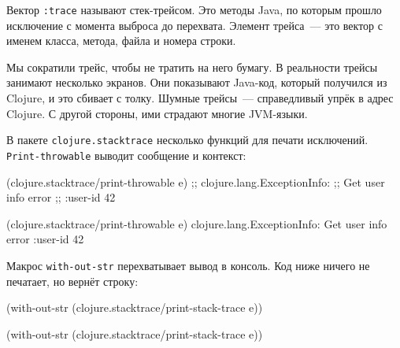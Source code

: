 \fi


Вектор \verb|:trace| называют стек-трейсом. Это методы Java, по которым прошло
исключение с момента выброса до перехвата. Элемент трейса~--- это вектор с именем
класса, метода, файла и номера строки.

Мы сократили трейс, чтобы не тратить на него бумагу. В реальности трейсы
занимают несколько экранов. Они показывают Java-код, который получился из
Clojure, и это сбивает с толку. Шумные трейсы~--- справедливый упрёк в адрес
Clojure. С другой стороны, ими страдают многие JVM-языки.


\mnoindent
В пакете \verb|clojure.stacktrace| несколько функций для печати
исключений. \verb|Print-throwable| выводит сообщение и контекст:

\ifx\DEVICETYPE\MOBILE

\begin{english}
  \begin{clojure}
(clojure.stacktrace/print-throwable e)
;; clojure.lang.ExceptionInfo:
;; Get user info error
;; {:user-id 42}
  \end{clojure}
\end{english}

\else

\begin{english}
  \begin{clojure}
(clojure.stacktrace/print-throwable e)
clojure.lang.ExceptionInfo: Get user info error
{:user-id 42}
  \end{clojure}
\end{english}

\fi

Макрос \verb|with-out-str| перехватывает вывод в консоль. Код ниже ничего не
печатает, но вернёт строку:

\ifx\DEVICETYPE\MOBILE

\begin{english}
  \begin{clojure}
(with-out-str
  (clojure.stacktrace/print-stack-trace
    e))
  \end{clojure}
\end{english}

\else

\begin{english}
  \begin{clojure}
(with-out-str
  (clojure.stacktrace/print-stack-trace e))
  \end{clojure}
\end{english}

